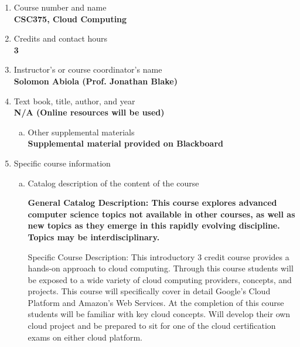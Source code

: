 \label{CSC375-Cloud}  %
\begin{enumerate}[1.]
\item Course number and name\\
  {\bfseries
    CSC375, Cloud Computing
  }

\item Credits and contact hours\\
  {\bfseries
    3
  }

\item Instructor's or course coordinator's name\\
  {\bfseries
    Solomon Abiola (Prof. Jonathan Blake)
  }

\item Text book, title, author, and year\\
  {\bfseries
    N/A (Online resources will be used)
  }
\begin{enumerate}[a.]
\item Other supplemental materials\\
  {\bfseries
    Supplemental material provided on Blackboard
  }
\end{enumerate}

\item Specific course information
\begin{enumerate}[a.]
\item Catalog description of the content of the course\\
  {\bfseries
General Catalog Description: This course explores advanced computer science topics not available in other courses, as well as new topics as they emerge in this rapidly evolving discipline. Topics may be interdisciplinary.

Specific Course Description: This introductory 3 credit course provides a hands-on approach to cloud computing. Through this course students will be exposed to a wide variety of cloud computing providers, concepts, and projects. This course will specifically cover in detail Google’s Cloud Platform and Amazon’s Web Services. At the completion of this course students will be familiar with key cloud concepts. Will develop their own cloud project and be prepared to sit for one of the cloud certification exams on either cloud platform.
  }


\end{enumerate}
\end{enumerate}
